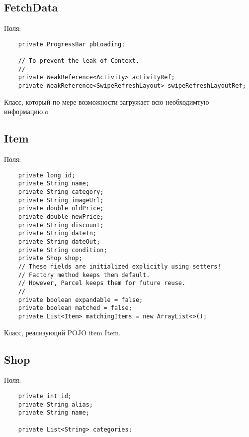 \subsection{FetchData}
Поля:\\
\begin{small}
    \begin{verbatim}
    private ProgressBar pbLoading;

    // To prevent the leak of Context.
    //
    private WeakReference<Activity> activityRef;
    private WeakReference<SwipeRefreshLayout> swipeRefreshLayoutRef;
\end{verbatim}
\end{small}

Класс, который по мере возможности загружает всю необходимтую информацию.o

\subsection{Item}
Поля:\\
\begin{small}
    \begin{verbatim}
    private long id;
    private String name;
    private String category;
    private String imageUrl;
    private double oldPrice;
    private double newPrice;
    private String discount;
    private String dateIn;
    private String dateOut;
    private String condition;
    private Shop shop;
    // These fields are initialized explicitly using setters!
    // Factory method keeps them default.
    // However, Parcel keeps them for future reuse.
    //
    private boolean expandable = false;
    private boolean matched = false;
    private List<Item> matchingItems = new ArrayList<>();
\end{verbatim}
\end{small}

Класс, реализуюций POJO item Item.


\subsection{Shop}
Поля:\\
\begin{small}
    \begin{verbatim}
    private int id;
    private String alias;
    private String name;

    private List<String> categories;
\end{verbatim}
\end{small}

